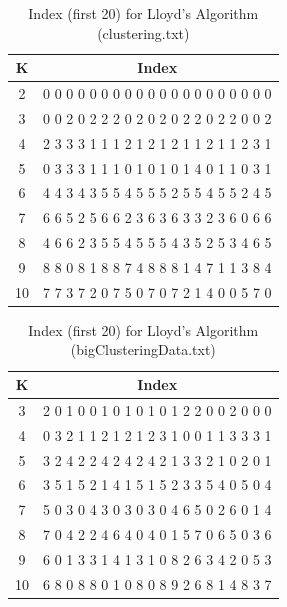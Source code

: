 \begin{description}
\begin{description}
\begin{table}[H]
	\centering
	\caption{Index (first 20) for Lloyd's Algorithm (clustering.txt)}
	\label{table:index_kmeans_clustering}	
	\begin{tabular}{ c | c }
		\hline \hline
		K        &    Index  \\[0.1cm]
		\hline
		2     &  0  0  0  0  0  0  0  0  0  0  0  0  0  0  0  0  0  0  0  0 \\[0.1cm]
		3     &  0  0  2  0  2  2  2  0  2  0  2  0  2  2  0  2  2  0  0  2 \\[0.1cm]
		4     &  2  3  3  3  1  1  1  2  1  2  1  2  1  1  2  1  1  2  3  1 \\[0.1cm]
		5     &  0  3  3  3  1  1  1  0  1  0  1  0  1  4  0  1  1  0  3  1 \\[0.1cm]
		6     &  4  4  3  4  3  5  5  4  5  5  5  2  5  5  4  5  5  2  4  5 \\[0.1cm]
		7     &  6  6  5  2  5  6  6  2  3  6  3  6  3  3  2  3  6  0  6  6 \\[0.1cm]
		8     &  4  6  6  2  3  5  5  4  5  5  5  4  3  5  2  5  3  4  6  5 \\[0.1cm]
		9     &  8  8  0  8  1  8  8  7  4  8  8  8  1  4  7  1  1  3  8  4 \\[0.1cm]
		10   &  7  7  3  7  2  0  7  5  0  7  0  7  2  1  4  0  0  5  7  0 \\[0.1cm]
		\hline	
	\end{tabular}
\end{table}

\begin{table}[H]
	\centering
	\caption{Index (first 20) for Lloyd's Algorithm (bigClusteringData.txt)}
	\label{table:index_kmeans_bigClustering}	
	\begin{tabular}{ c | c }
		\hline \hline
		K    & Index \\[0.1cm]
		\hline
		3     &  2  0  1  0  0  1  0  1  0  1  0  1  2  2  0  0  2  0  0  0 \\[0.1cm]
		4     &  0  3  2  1  1  2  1  2  1  2  3  1  0  0  1  1  3  3  3  1 \\[0.1cm]
		5     &  3  2  4  2  2  4  2  4  2  4  2  1  3  3  2  1  0  2  0  1 \\[0.1cm]
		6     &  3  5  1  5  2  1  4  1  5  1  5  2  3  3  5  4  0  5  0  4 \\[0.1cm]
		7     &  5  0  3  0  4  3  0  3  0  3  0  4  6  5  0  2  6  0  1  4 \\[0.1cm]
		8     &  7  0  4  2  2  4  6  4  0  4  0  1  5  7  0  6  5  0  3  6 \\[0.1cm]
		9     &  6  0  1  3  3  1  4  1  3  1  0  8  2  6  3  4  2  0  5  3 \\[0.1cm]
		10   &  6  8  0  8  8  0  1  0  8  0  8  9  2  6  8  1  4  8  3  7 \\[0.1cm]
		\hline	
	\end{tabular}
\end{table}


\end{description}
\end{description}

